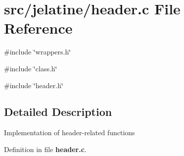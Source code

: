 \section{src/jelatine/header.c File Reference}
\label{header_8c}
{\ttfamily \#include \char`\"{}wrappers.h\char`\"{}}\par
{\ttfamily \#include \char`\"{}class.h\char`\"{}}\par
{\ttfamily \#include \char`\"{}header.h\char`\"{}}\par


\subsection{Detailed Description}
Implementation of header-\/related functions 

Definition in file {\bf header.c}.

